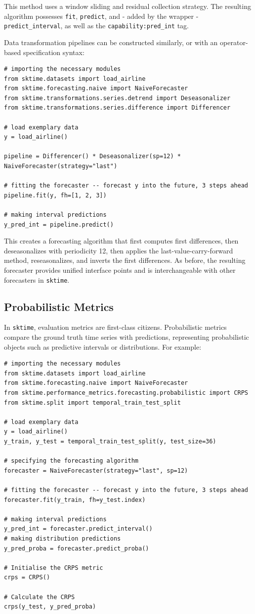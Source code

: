 This method uses a window sliding and residual collection strategy.
The resulting algorithm possesses \texttt{fit}, \texttt{predict}, and - added by the wrapper - \texttt{predict\_interval}, as well as the \texttt{capability:pred\_int} tag.

Data transformation pipelines can be constructed similarly, or with an operator-based specification syntax:

\begin{verbatim}
# importing the necessary modules
from sktime.datasets import load_airline
from sktime.forecasting.naive import NaiveForecaster
from sktime.transformations.series.detrend import Deseasonalizer
from sktime.transformations.series.difference import Differencer

# load exemplary data
y = load_airline()

pipeline = Differencer() * Deseasonalizer(sp=12) * NaiveForecaster(strategy="last")

# fitting the forecaster -- forecast y into the future, 3 steps ahead
pipeline.fit(y, fh=[1, 2, 3])

# making interval predictions
y_pred_int = pipeline.predict()
\end{verbatim}

This creates a forecasting algorithm that first computes first differences, then deseasonalizes with periodicity 12, then applies the last-value-carry-forward method, reseasonalizes, and inverts the first differences.
As before, the resulting forecaster provides unified interface points and is interchangeable with other forecasters in \texttt{sktime}.

\subsection{Probabilistic Metrics}
In \texttt{sktime}, evaluation metrics are first-class citizens. Probabilistic metrics compare the ground truth time series with predictions, representing probabilistic objects such as predictive intervals or distributions. For example:

\begin{verbatim}
# importing the necessary modules
from sktime.datasets import load_airline
from sktime.forecasting.naive import NaiveForecaster
from sktime.performance_metrics.forecasting.probabilistic import CRPS
from sktime.split import temporal_train_test_split

# load exemplary data
y = load_airline()
y_train, y_test = temporal_train_test_split(y, test_size=36)

# specifying the forecasting algorithm
forecaster = NaiveForecaster(strategy="last", sp=12)

# fitting the forecaster -- forecast y into the future, 3 steps ahead
forecaster.fit(y_train, fh=y_test.index)

# making interval predictions
y_pred_int = forecaster.predict_interval()
# making distribution predictions
y_pred_proba = forecaster.predict_proba()

# Initialise the CRPS metric
crps = CRPS()

# Calculate the CRPS
crps(y_test, y_pred_proba)
\end{verbatim}

